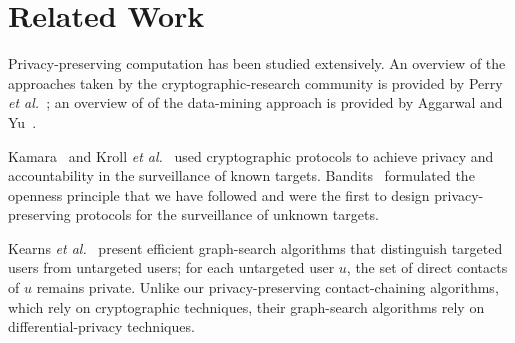 \section{Related Work}\label{sec-related}
Privacy-preserving computation has been studied extensively. An overview
of the approaches taken by the cryptographic-research community is provided by
Perry {\it et al.}~\cite{pgfw-scn2014}; an overview of of the data-mining
approach is provided by Aggarwal and Yu~\cite{ay2008}.  

Kamara~\cite{kamara}
and Kroll {\it et al.}~\cite{kroll} used cryptographic protocols to 
achieve privacy and accountability in the surveillance of known targets.
Bandits~\cite{sff-foci2014} formulated the openness principle that
we have followed and were the first to design privacy-preserving protocols for
the surveillance of unknown targets.  

Kearns {\it et al.}~\cite{krwy-pnas16} present efficient graph-search 
algorithms that distinguish targeted users from untargeted users; for each 
untargeted user $u$, the set of direct contacts of $u$ remains private.
Unlike our privacy-preserving contact-chaining algorithms, which rely
on cryptographic techniques, their graph-search algorithms rely on 
differential-privacy techniques.

